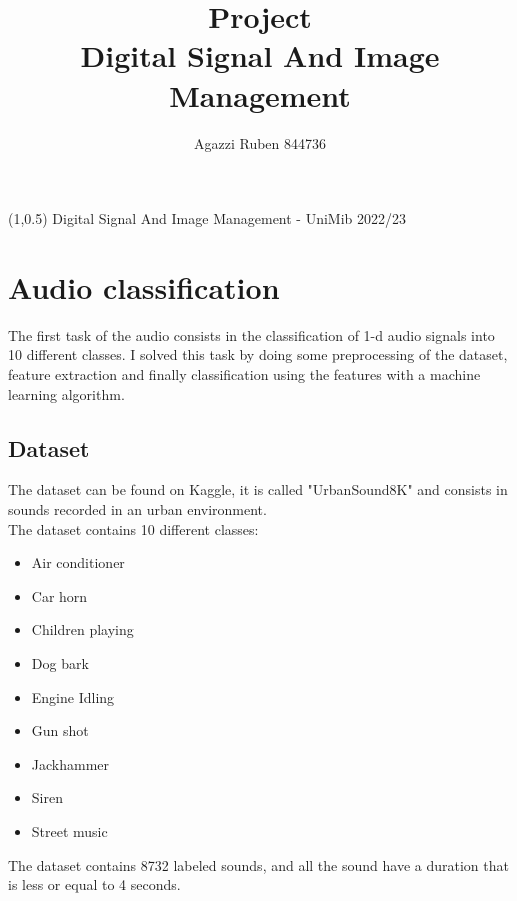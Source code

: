 \documentclass[12pt,journal,compsoc]{IEEEtran}
\begin{document}
\begin{textblock}{5}(1,0.5)
\noindent\small Digital Signal And Image Management - UniMib 2022/23
\end{textblock}

\title{Project\\
\vspace{2mm}\large{Digital Signal And Image Management}}
\author{Agazzi Ruben 844736}


\maketitle
\IEEEpeerreviewmaketitle
\IEEEdisplaynontitleabstractindextext

\tableofcontents


\section{Audio classification}
The first task of the audio consists in the classification of 1-d audio signals into 10 different classes. I solved this task by doing some preprocessing of the dataset, feature extraction and finally classification using the features with a machine learning algorithm.
\subsection{Dataset}
The dataset can be found on Kaggle, it is called "UrbanSound8K"\cite{dataset1} and consists in sounds recorded in an urban environment.\\
The dataset contains 10 different classes:
\begin{itemize}
	\item Air conditioner
	\item Car horn
	\item Children playing
	\item Dog bark
	\item Engine Idling
	\item Gun shot
	\item Jackhammer
	\item Siren
	\item Street music
\end{itemize}
The dataset contains 8732 labeled sounds, and all the sound have a duration that is less or equal to 4 seconds.
\end{document}
